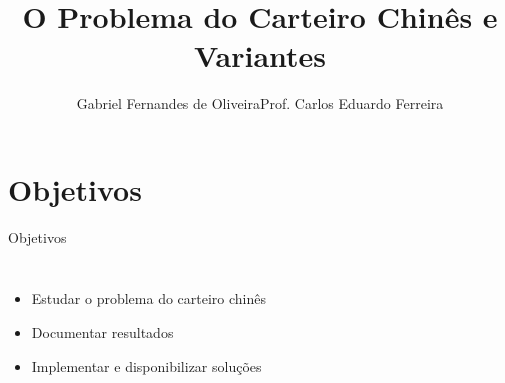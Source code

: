 \documentclass{beamer}
\title[Problema do Carteiro Chinês e Variações]{O Problema do Carteiro Chinês e Variantes}
\author[Gabriel F. Oliveira]{Gabriel Fernandes de Oliveira\newline Prof. Carlos Eduardo Ferreira}
\institute[IME - USP]{Instituto de Matemática e Estatística da USP}
\begin{document}

\begin{frame}
    \titlepage
\end{frame}
    

\section{Objetivos}

\begin{frame}{Objetivos}

    \begin{columns}

        \begin{itemize}
            \item Estudar o problema do carteiro chinês
            \item Documentar resultados
            \item Implementar e disponibilizar soluções 
        \end{itemize}


\end{columns}
\end{frame}
\end{document}
